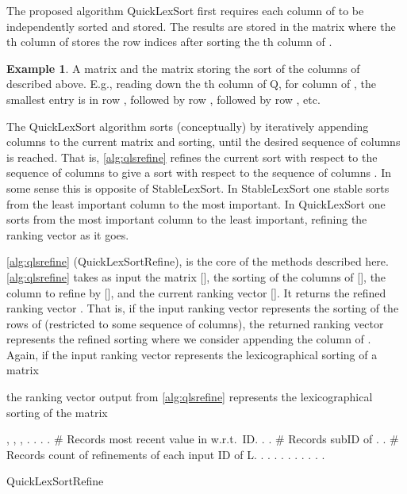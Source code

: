 \documentclass[a4paper,10pt,reqno]{amsart}
\theoremstyle{definition}
\newtheorem{example}{Example}
\begin{document}
The proposed algorithm QuickLexSort first requires each column of  to be
independently sorted and stored. The results are stored in the matrix  where the th column  of  stores the row indices
 after sorting the th column  of .  


\begin{example}

A matrix  and the matrix  storing the sort of the columns of 
described above. E.g., reading down the th column of Q, for column  of , the smallest
entry is in row , followed by row , followed by row , etc.
\end{example}

The QuickLexSort algorithm sorts (conceptually) by iteratively appending 
columns to the current matrix and sorting, until the desired sequence of columns is reached. That is,
\autoref{alg:qlsrefine} refines the current sort with respect to the sequence of columns
 to give a sort with respect to the sequence of columns
. In some sense this is opposite of StableLexSort.  In
StableLexSort one stable sorts from the least important column to the most
important. In QuickLexSort one sorts from the most important column to the
least important, refining the ranking vector as it goes.

\autoref{alg:qlsrefine} (QuickLexSortRefine), is the core of the methods described here.
\autoref{alg:qlsrefine} takes as input the matrix  [], the sorting of the
columns of  [], the column to refine  by [], and the
current ranking vector []. It returns the refined ranking vector . That
is, if the input ranking vector  represents the sorting of the rows of 
(restricted to some sequence of columns), the returned ranking vector 
represents the refined sorting where we consider appending the  column of
. Again, if the input ranking vector  represents the lexicographical
sorting of a matrix

the ranking vector  output from \autoref{alg:qlsrefine} represents the lexicographical sorting of the matrix


\begin{algorithm}[!h]
\begin{algorithmic}[1]
    \REQUIRE , , , .
    \ENSURE .
    \STATE . 
    \STATE . \# Records most recent value in  w.r.t.\ ID.
    \STATE .
    \STATE . \# Records subID of .
    \STATE . \# Records count of refinements of each input ID of L.
    \FOR{  }
        \IF{ } \STATE .
            \STATE .
        \ELSE
            \IF{ }
                \STATE .
                \STATE .
            \ENDIF
        \ENDIF
        \STATE .
    \ENDFOR
    \STATE .
    \STATE .
    \FOR{  }
        \STATE .
    \ENDFOR
    \FOR{ }
        \STATE .
    \ENDFOR
    \RETURN .
\end{algorithmic}
\caption{QuickLexSortRefine}
\label{alg:qlsrefine}
\end{algorithm}
\end{document}
